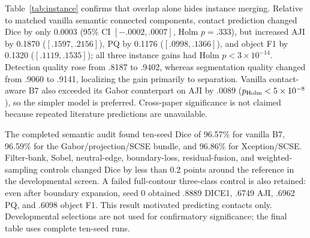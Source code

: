 \documentclass{article}
\begin{document}
Table~\ref{tab:instance} confirms that overlap alone hides instance merging. Relative to matched vanilla semantic connected components, contact prediction changed Dice by only 0.0003 (95\% CI $[-.0002,.0007]$, Holm $p=.333$), but increased AJI by 0.1870 ($[.1597,.2156]$), PQ by 0.1176 ($[.0998,.1366]$), and object F1 by 0.1320 ($[.1119,.1535]$); all three instance gains had Holm $p<3\times10^{-14}$. Detection quality rose from .8187 to .9402, whereas segmentation quality changed from .9060 to .9141, localizing the gain primarily to separation. Vanilla contact-aware B7 also exceeded its Gabor counterpart on AJI by .0089 ($p_{\rm Holm}<5\times10^{-8}$), so the simpler model is preferred. Cross-paper significance is not claimed because repeated literature predictions are unavailable.

The completed semantic audit found ten-seed Dice of 96.57\% for vanilla B7, 96.59\% for the Gabor/projection/SCSE bundle, and 96.86\% for Xception/SCSE. Filter-bank, Sobel, neutral-edge, boundary-loss, residual-fusion, and weighted-sampling controls changed Dice by less than 0.2 points around the reference in the developmental screen. A failed full-contour three-class control is also retained: even after boundary expansion, seed 0 obtained .8889 DICE1, .6749 AJI, .6962 PQ, and .6098 object F1. This result motivated predicting contacts only. Developmental selections are not used for confirmatory significance; the final table uses complete ten-seed runs.
\end{document}
